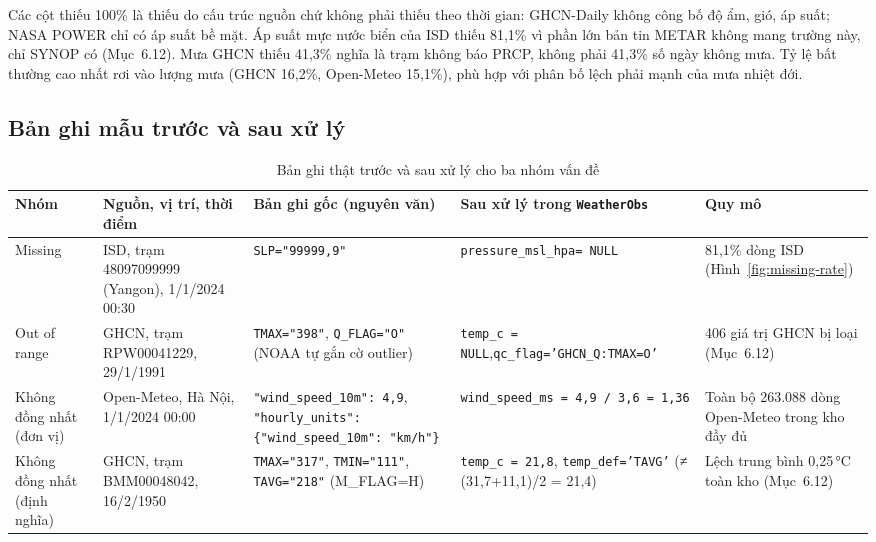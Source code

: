 \documentclass[12pt,a4paper]{report}
\begin{document}
Các cột thiếu 100\% là thiếu do cấu trúc nguồn chứ không phải thiếu theo thời gian: GHCN-Daily không
công bố độ ẩm, gió, áp suất; NASA POWER chỉ có áp suất bề mặt. Áp suất mực nước biển của ISD thiếu
81,1\% vì phần lớn bản tin METAR không mang trường này, chỉ SYNOP có (Mục~6.12). Mưa GHCN thiếu 41,3\%
nghĩa là trạm không báo PRCP, không phải 41,3\% số ngày không mưa. Tỷ lệ bất thường cao nhất rơi vào
lượng mưa (GHCN 16,2\%, Open-Meteo 15,1\%), phù hợp với phân bố lệch phải mạnh của mưa nhiệt đới.

\subsection{Bản ghi mẫu trước và sau xử lý}

\begin{table}[!htbp]
\centering\footnotesize
\caption{Bản ghi thật trước và sau xử lý cho ba nhóm vấn đề}
\label{tab:sample-records}
\begin{tabular}{@{}p{1.5cm}p{3.3cm}p{3.3cm}p{3.1cm}p{2.1cm}@{}}
\toprule
Nhóm & Nguồn, vị trí, thời điểm & Bản ghi gốc (nguyên văn) & Sau xử lý trong \texttt{WeatherObs} & Quy mô \\
\midrule
Missing &
ISD, trạm 48097099999 (Yangon), 1/1/2024 00:30 &
\texttt{SLP="99999,9"} &
\texttt{pressure\_msl\_hpa}\newline\texttt{= NULL} &
81,1\% dòng ISD (Hình~\ref{fig:missing-rate}) \\ \addlinespace[3pt]
Out of range &
GHCN, trạm RPW00041229, 29/1/1991 &
\texttt{TMAX="398"}, \texttt{Q\_FLAG="O"} (NOAA tự gắn cờ outlier) &
\texttt{temp\_c = NULL},\newline\texttt{qc\_flag=}\newline\texttt{'GHCN\_Q:TMAX=O'} &
406 giá trị GHCN bị loại (Mục~6.12) \\ \addlinespace[3pt]
Không đồng nhất (đơn vị) &
Open-Meteo, Hà Nội, 1/1/2024 00:00 &
\texttt{"wind\_speed\_10m": 4,9}, \texttt{"hourly\_units": \{"wind\_speed\_10m": "km/h"\}} &
\texttt{wind\_speed\_ms = 4,9 / 3,6 = 1,36} &
Toàn bộ 263.088 dòng Open-Meteo trong kho đầy đủ \\ \addlinespace[3pt]
Không đồng nhất (định nghĩa) &
GHCN, trạm BMM00048042, 16/2/1950 &
\texttt{TMAX="317"}, \texttt{TMIN="111"}, \texttt{TAVG="218"} (M\_FLAG=H) &
\texttt{temp\_c = 21,8}, \texttt{temp\_def='TAVG'} (≠ (31,7+11,1)/2 = 21,4) &
Lệch trung bình 0,25\,°C toàn kho (Mục~6.12) \\
\bottomrule
\end{tabular}
\end{table}
\end{document}
